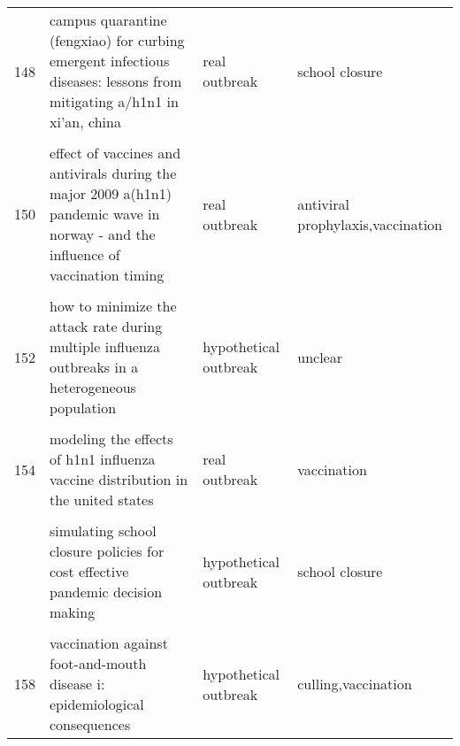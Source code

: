 \documentclass[
]{article}
\begin{document}
\begin{landscape}
\begin{longtable}{l>{\raggedright\arraybackslash}p{3cm}l>{\raggedright\arraybackslash}p{8cm}}
148 & campus quarantine (fengxiao) for curbing emergent infectious diseases: lessons from mitigating a/h1n1 in xi'an, china & real outbreak & school closure\\
\cellcolor{gray!6}{149} & \cellcolor{gray!6}{dynamic modelling of costs and health consequences of school closure during an influenza pandemic} & \cellcolor{gray!6}{hypothetical outbreak} & \cellcolor{gray!6}{school closure}\\
150 & effect of vaccines and antivirals during the major 2009 a(h1n1) pandemic wave in norway - and the influence of vaccination timing & real outbreak & antiviral prophylaxis,vaccination\\
\addlinespace
\cellcolor{gray!6}{151} & \cellcolor{gray!6}{estimating the value of containment strategies in delaying the arrival time of an influenza pandemic: a case study of travel restriction and patient isolation} & \cellcolor{gray!6}{hypothetical outbreak} & \cellcolor{gray!6}{isolation,travel restriction}\\
152 & how to minimize the attack rate during multiple influenza outbreaks in a heterogeneous population & hypothetical outbreak & unclear\\
\cellcolor{gray!6}{153} & \cellcolor{gray!6}{modeling strategies for controlling h1n1 outbreaks in china} & \cellcolor{gray!6}{real outbreak} & \cellcolor{gray!6}{isolation,quarantine}\\
154 & modeling the effects of h1n1 influenza vaccine distribution in the united states & real outbreak & vaccination\\
\cellcolor{gray!6}{155} & \cellcolor{gray!6}{modeling the impact of air, sea, and land travel restrictions supplemented by other interventions on the emergence of a new influenza pandemic virus} & \cellcolor{gray!6}{hypothetical outbreak} & \cellcolor{gray!6}{travel restriction,hospitalization,antiviral treatment}\\
\addlinespace
156 & simulating school closure policies for cost effective pandemic decision making & hypothetical outbreak & school closure\\
\cellcolor{gray!6}{157} & \cellcolor{gray!6}{the impact of school closures on pandemic influenza: assessing potential repercussions using a seasonal sir model} & \cellcolor{gray!6}{hypothetical outbreak} & \cellcolor{gray!6}{school closure}\\
158 & vaccination against foot-and-mouth disease i: epidemiological consequences & hypothetical outbreak & culling,vaccination\\

\end{longtable}
\end{landscape}
\end{document}
